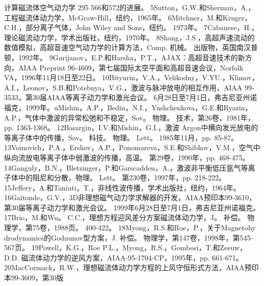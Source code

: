 \documentclass[UTF8,11pt,a4paper,openany,fontset=fandol]{ctexbook}
\begin{document}
计算磁流体空气动力学 295 566和572的进展。 5Sutton，G.W.和Sherman，A.，工程磁流体动力学，McGraw-Hill，纽约，1965年。 6Mitchner，M.和Kruger，C.H.，部分离子气体，John Wiley and Sons，纽约。 1973年。 7Cabanese，H.，理论磁流动力学，学术出版社，纽约，1970年。 8Shang，J.S.，高超声速流动的数值模拟，高超音速空气动力学的计算方法，Comp. 机械。 出版物，英国南汉普顿，1992年。 9Gurijanov，E.P.和Harsha，P.T.，AJAX：高超音速技术的新方向，AIAA Preprint 96-4609，第七届国际太空平面和高超音速会议，Norfolk VA，1996年11月18日至22日。 10Bityurin，V.A.，Velikodny，V.YU.，Klimov，A.I.，Leonov，S.B.和Potebnya，V.G.，激波与脉冲放电的相互作用，AIAA 99-3533，第30届AIAA等离子动力学和激光会议。 6月28日至7月1日，弗吉尼亚州诺福克，1999年。uMishin，A.P.，Bedin，N.I.，Yushchenkova，G.E.和Ryazin，A.P.，气体中激波的异常松弛和不稳定，Sov。 物理。 技术，第26卷，1981年，pp. 1363-1368。 12Basargin，I.V.和Mishin，G.I.，激波 Argon中横向发光放电的等离子体中的传播，Sov。 科技。 物理。 Lett。 1985年11月，pp. 85-87。 13Voinovich，P.A.，Ershov，A.P.，Ponomareva，S.E.和Shibkov，V.M.，空气中纵向流放电等离子体中弱激波的传播，高温。 第29卷，1990年，pp. 468-475。 14Ganguly，B.N.，Bletzinger，P.和Garscadden，A.，激波非平衡低压氩气等离子体中的阻尼和分散，物理。 Lett。 第230卷，1997年，pp. 218-222。 15Jeffery，A.和Taniuti，T.，非线性波传播，学术出版社，纽约，1964年。 16Gaitonde，G.V.，3D非理想磁气动力学求解器的开发，AIAA预印本99-3610，第30届等离子动力学和激光会议。 1999年6月28日至7月1日，弗吉尼亚州诺福克。 17Brio，M.和Wu。 C.C.，理想方程迎风差分方案磁流体动力学，J。 补偿。 物理学，第75卷，1988页。 400-422。 18Myong，R.S.和Roe，P.，关于Magnetohy drodynamics的Godnunov型方案，J. 补偿。 物理学，第147卷，1998年，第545-567页。 19Powell，K.G.，Roe P.L.，Myong，R.S.，Gombosi，T.和Zeeuw，D.D. 磁流体动力学的逆风方案，AIAA-95-1704-CP，1995年，pp. 661-671。 20MacCormack，R.W.，理想磁流体动力学方程的上风守恒形式方法，AIAA预印本99-3609，第30版
\end{document}
